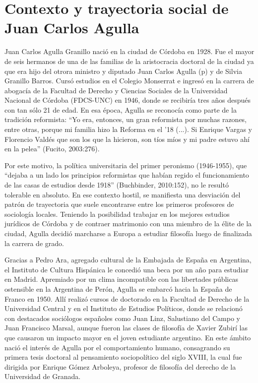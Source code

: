 \section{Contexto y trayectoria social de Juan Carlos Agulla}

Juan Carlos Agulla Granillo nació en la ciudad de Córdoba en 1928. Fue el mayor de seis hermanos de una de las familias de la aristocracia doctoral de la ciudad ya que era hijo del otrora ministro y diputado Juan Carlos Agulla (p) y de Silvia Granillo Barros. Cursó estudios en el Colegio Monserrat e ingresó en la carrera de abogacía de la Facultad de Derecho y Ciencias Sociales de la Universidad Nacional de Córdoba (FDCS-UNC) en 1946, donde se recibiría tres años después con tan sólo 21 de edad. En esa época, Agulla se reconocía como parte de la tradición reformista: ``Yo era, entonces, un gran reformista por muchas razones, entre otras, porque mi familia hizo la Reforma en el '18 (...). Si Enrique Vargas y Florencio Valdés que son los que la hicieron, son tíos míos y mi padre estuvo ahí en la pelea'' (Fucito, 2003:276).

Por este motivo, la política universitaria del primer peronismo (1946-1955), que ``dejaba a un lado los principios reformistas que habían regido el funcionamiento de las casas de estudios desde 1918'' (Buchbinder, 2010:152), no le resultó tolerable en absoluto. En ese contexto hostil, se manifiesta una desviación del patrón de trayectoria que suele encontrarse entre los primeros profesores de sociología locales. Teniendo la posibilidad trabajar en los mejores estudios jurídicos de Córdoba y de contraer matrimonio con una miembro de la élite de la ciudad, Agulla decidió marcharse a Europa a estudiar filosofía luego de finalizada la carrera de grado.

Gracias a Pedro Ara, agregado cultural de la Embajada de España en Argentina, el Instituto de Cultura Hispánica le concedió una beca por un año para estudiar en Madrid. Apremiado por un clima incompatible con las libertades públicas ostensible en la Argentina de Perón, Agulla se embarcó hacia la España de Franco en 1950. Allí realizó cursos de doctorado en la Facultad de Derecho de la Universidad Central y en el Instituto de Estudios Políticos, donde se relacionó con destacados sociólogos españoles como Juan Linz, Salustiano del Campo y Juan Francisco Marsal, aunque fueron las clases de filosofía de Xavier Zubirí las que causaron un impacto mayor en el joven estudiante argentino. En este ámbito nació el interés de Agulla por el comportamiento humano, consagrando su primera tesis doctoral al pensamiento sociopolítico del siglo XVIII, la cual fue dirigida por Enrique Gómez Arboleya, profesor de filosofía del derecho de la Universidad de Granada.

